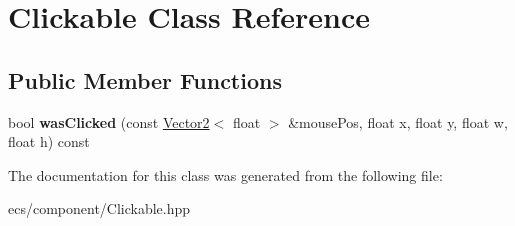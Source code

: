 \hypertarget{class_clickable}{}\section{Clickable Class Reference}
\label{class_clickable}
\subsection*{Public Member Functions}
\begin{DoxyCompactItemize}
\item 
\mbox{\label{class_clickable_a43d73ba123a997e1b44c60058345a867}} 
bool {\bfseries was\+Clicked} (const \mbox{\hyperlink{class_vector2}{Vector2}}$<$ float $>$ \&mouse\+Pos, float x, float y, float w, float h) const
\end{DoxyCompactItemize}


The documentation for this class was generated from the following file\+:\begin{DoxyCompactItemize}
\item 
ecs/component/Clickable.\+hpp\end{DoxyCompactItemize}
